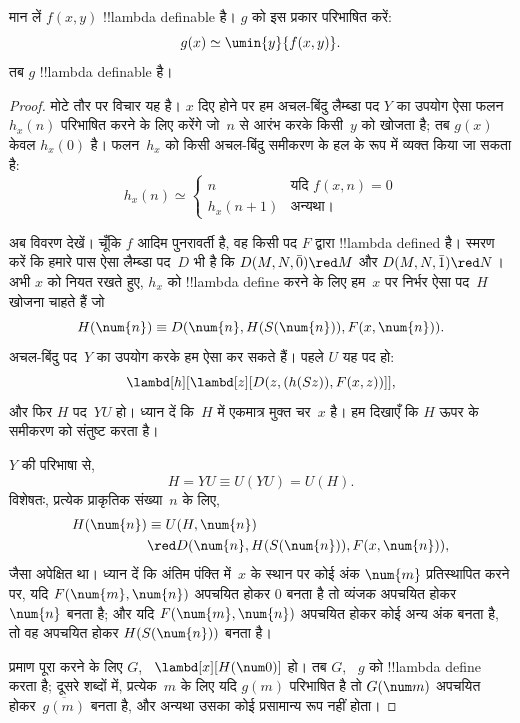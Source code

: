 \documentclass[../../../include/open-logic-section]{subfiles}
\begin{document}

\begin{lem}
मान लें $f(x,y)$ !!{lambda definable} है। $g$ को इस प्रकार परिभाषित करें:
\[
g(x) \simeq \umin{y}{f(x,y)}.
\]
तब $g$ !!{lambda definable} है।
\end{lem}

\begin{proof}
मोटे तौर पर विचार यह है। $x$ दिए होने पर हम अचल-बिंदु लैम्ब्डा पद $Y$ का
उपयोग ऐसा फलन $h_x(n)$ परिभाषित करने के लिए करेंगे जो~$n$ से आरंभ करके
किसी~$y$ को खोजता है; तब $g(x)$ केवल $h_x(0)$ है। फलन~$h_x$ को किसी
अचल-बिंदु समीकरण के हल के रूप में व्यक्त किया जा सकता है:
\[
h_x(n) \simeq
\begin{cases}
n & \text{यदि $f(x,n) = 0$} \\
h_x(n+1) & \text{अन्यथा।}
\end{cases}
\]

अब विवरण देखें। चूँकि $f$ आदिम पुनरावर्ती है, वह किसी पद $F$ द्वारा
!!{lambda defined} है। स्मरण करें कि हमारे पास ऐसा लैम्ब्डा पद~$D$ भी है
कि $D(M, N, \bar{0}) \red M$ और $D(M, N, \bar{1}) \red N$। अभी $x$ को
नियत रखते हुए, $h_x$ को !!{lambda define} करने के लिए हम~$x$ पर निर्भर ऐसा
पद~$H$ खोजना चाहते हैं जो
\[
H(\num{n}) \equiv D(\num{n}, H(S(\num{n})), F(x, \num{n})).
\]
अचल-बिंदु पद~$Y$ का उपयोग करके हम ऐसा कर सकते हैं। पहले $U$ यह पद हो:
\[
\lambd[h][\lambd[z][D(z,(h(Sz)),F(x,z))]],
\]
और फिर $H$ पद~$YU$ हो। ध्यान दें कि~$H$ में एकमात्र मुक्त चर~$x$ है। हम
दिखाएँ कि $H$ ऊपर के समीकरण को संतुष्ट करता है।

$Y$ की परिभाषा से,
\[
H = YU \equiv U(YU) = U(H).
\]
विशेषतः, प्रत्येक प्राकृतिक संख्या~$n$ के लिए,
\begin{align*}
H(\num{n}) & \equiv U(H, \num{n}) \\
& \red D(\num{n}, H(S(\num{n})), F(x, \num{n})),
\end{align*}
जैसा अपेक्षित था। ध्यान दें कि अंतिम पंक्ति में~$x$ के स्थान पर कोई अंक
$\num{m}$ प्रतिस्थापित करने पर, यदि $F(\num{m}, \num{n})$ अपचयित होकर
$\num{0}$ बनता है तो व्यंजक अपचयित होकर $\num{n}$ बनता है; और यदि
$F(\num{m}, \num{n})$ अपचयित होकर कोई अन्य अंक बनता है, तो वह अपचयित होकर
$H(S(\num{n}))$ बनता है।

प्रमाण पूरा करने के लिए $G$, ~$\lambd[x][H(\num 0)]$ हो। तब $G$, ~$g$ को
!!{lambda define} करता है; दूसरे शब्दों में, प्रत्येक~$m$ के लिए यदि
$g(m)$ परिभाषित है तो $G(\num m)$ अपचयित होकर~$\overline {g(m)}$ बनता है,
और अन्यथा उसका कोई प्रसामान्य रूप नहीं होता।
\end{proof}
\end{document}

